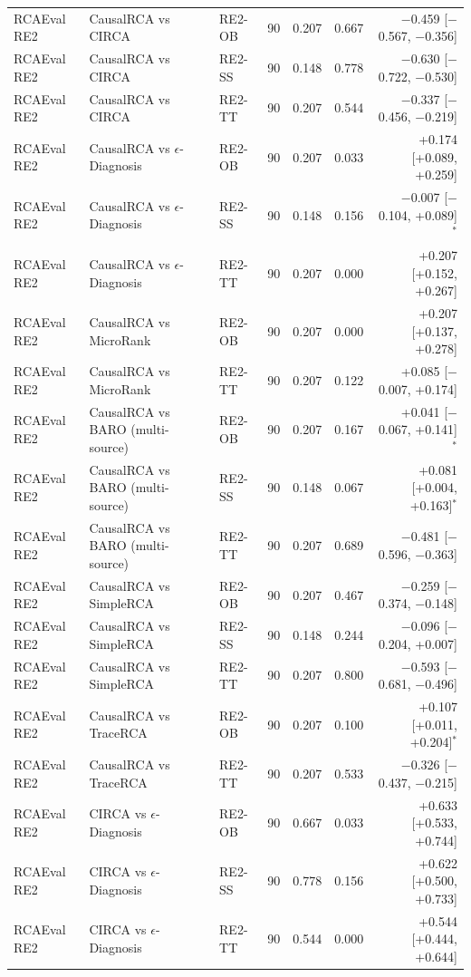 {\begin{longtable}{llllrrr}
RCAEval RE2 & CausalRCA vs CIRCA & RE2-OB & 90 & 0.207 & 0.667 & $-$0.459 [$-$0.567, $-$0.356] \\
RCAEval RE2 & CausalRCA vs CIRCA & RE2-SS & 90 & 0.148 & 0.778 & $-$0.630 [$-$0.722, $-$0.530] \\
RCAEval RE2 & CausalRCA vs CIRCA & RE2-TT & 90 & 0.207 & 0.544 & $-$0.337 [$-$0.456, $-$0.219] \\
RCAEval RE2 & CausalRCA vs $\epsilon$-Diagnosis & RE2-OB & 90 & 0.207 & 0.033 & +0.174 [+0.089, +0.259] \\
RCAEval RE2 & CausalRCA vs $\epsilon$-Diagnosis & RE2-SS & 90 & 0.148 & 0.156 & $-$0.007 [$-$0.104, +0.089]$^\ast$ \\
RCAEval RE2 & CausalRCA vs $\epsilon$-Diagnosis & RE2-TT & 90 & 0.207 & 0.000 & +0.207 [+0.152, +0.267] \\
RCAEval RE2 & CausalRCA vs MicroRank & RE2-OB & 90 & 0.207 & 0.000 & +0.207 [+0.137, +0.278] \\
RCAEval RE2 & CausalRCA vs MicroRank & RE2-TT & 90 & 0.207 & 0.122 & +0.085 [$-$0.007, +0.174] \\
RCAEval RE2 & CausalRCA vs BARO (multi-source) & RE2-OB & 90 & 0.207 & 0.167 & +0.041 [$-$0.067, +0.141]$^\ast$ \\
RCAEval RE2 & CausalRCA vs BARO (multi-source) & RE2-SS & 90 & 0.148 & 0.067 & +0.081 [+0.004, +0.163]$^\ast$ \\
RCAEval RE2 & CausalRCA vs BARO (multi-source) & RE2-TT & 90 & 0.207 & 0.689 & $-$0.481 [$-$0.596, $-$0.363] \\
RCAEval RE2 & CausalRCA vs SimpleRCA & RE2-OB & 90 & 0.207 & 0.467 & $-$0.259 [$-$0.374, $-$0.148] \\
RCAEval RE2 & CausalRCA vs SimpleRCA & RE2-SS & 90 & 0.148 & 0.244 & $-$0.096 [$-$0.204, +0.007] \\
RCAEval RE2 & CausalRCA vs SimpleRCA & RE2-TT & 90 & 0.207 & 0.800 & $-$0.593 [$-$0.681, $-$0.496] \\
RCAEval RE2 & CausalRCA vs TraceRCA & RE2-OB & 90 & 0.207 & 0.100 & +0.107 [+0.011, +0.204]$^\ast$ \\
RCAEval RE2 & CausalRCA vs TraceRCA & RE2-TT & 90 & 0.207 & 0.533 & $-$0.326 [$-$0.437, $-$0.215] \\
RCAEval RE2 & CIRCA vs $\epsilon$-Diagnosis & RE2-OB & 90 & 0.667 & 0.033 & +0.633 [+0.533, +0.744] \\
RCAEval RE2 & CIRCA vs $\epsilon$-Diagnosis & RE2-SS & 90 & 0.778 & 0.156 & +0.622 [+0.500, +0.733] \\
RCAEval RE2 & CIRCA vs $\epsilon$-Diagnosis & RE2-TT & 90 & 0.544 & 0.000 & +0.544 [+0.444, +0.644] \\

\end{longtable}}
